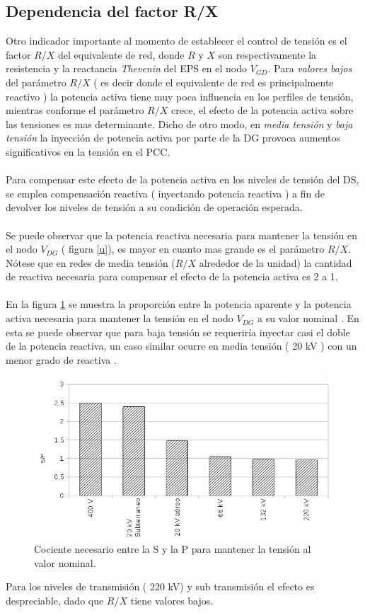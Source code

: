 \documentclass[12pt, letterpaper]{report}
\begin{document}
\subsection{Dependencia del factor R/X}
Otro indicador importante al momento de establecer el control de tensión es el factor $ R/X$ del equivalente de red, donde $R$  y $X$ son respectivamente la resistencia y la reactancia  \textit{Thevenin} del EPS en el nodo $V_{GD}$.    Para \textit{valores bajos} del parámetro $R/X$ ( es decir donde el equivalente de red es principalmente reactivo ) la potencia activa tiene muy poca  influencia en los perfiles de tensión, mientras conforme el parámetro $R/X$ crece, el efecto de la potencia activa sobre las tensiones es mas determinante. Dicho de otro modo, en \textit{media tensión } y \textit{baja tensión } la inyección de potencia activa por parte de la DG provoca aumentos significativos en la tensión en el PCC.\\\\
Para compensar este  efecto de la potencia activa  en los niveles de tensión del DS,  se emplea  compensación reactiva ( inyectando potencia reactiva ) a fin de  devolver los niveles de tensión a su condición de operación esperada.\\\\
Se puede observar que la potencia reactiva necesaria para mantener la tensión en el nodo $ V_{DG}$ ( figura \ref{u}), es  mayor en cuanto mas grande es el  parámetro $R/X$. Nótese que en redes de media tensión ($R/X$ alrededor de la unidad) la cantidad de  reactiva necesaria para compensar el efecto de la potencia activa es 2 a 1.\\\\
En la figura \ref{fig:s-p} se muestra  la proporción entre la potencia aparente  y la potencia activa necesaria para mantener la tensión  en el nodo $V_{DG}$ a su valor nominal . En esta se puede observar que para baja tensión se requeriría inyectar  casi el doble de la potencia reactiva, un caso similar ocurre en media tensión     ( 20 kV ) con un menor grado de reactiva \cite{trebolle2012control}.
\begin{figure}[H]
    \caption{Cociente necesario entre la S y la P para mantener la tensión al valor nominal. }
    \label{fig:s-p}
    \centering
    \includegraphics[width = 15cm]{imagenes/cap_1/s-p.png} 
    
\end{figure}
Para los niveles de transmisión ( 220 kV) y sub transmisión  el efecto es despreciable, dado que $R/X$ tiene valores bajos. 
\end{document}
